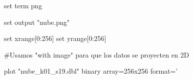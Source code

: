 set term png

set output "nube.png"

set xrange[0:256]
set yrange[0:256]

#Usamos "with image" para que los datos se proyecten en 2D

plot "nube_k01_s19.dbl" binary array=256x256 format='%